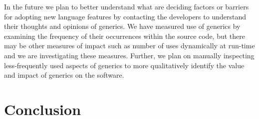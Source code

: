 \documentclass{svjour3}
\begin{document}
In the future we plan to better understand 
what are deciding factors or barriers for adopting new language features by contacting the developers 
to understand their thoughts and opinions of generics.  We have measured use of generics by examining 
the frequency of their occurrences within the source code, but there may be other measures of impact
such as number of uses dynamically at run-time and we are investigating these measures.
Further, we plan on manually inspecting less-frequently used aspects of generics to more qualitatively 
identify the value and impact of generics on the software.




% 
% 

\section{Conclusion}
\end{document}
